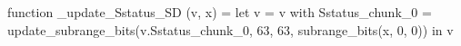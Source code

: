 function _update_Sstatus_SD (v, x) = let v = { v with Sstatus_chunk_0 = update_subrange_bits(v.Sstatus_chunk_0, 63, 63, subrange_bits(x, 0, 0)) } in
  v
